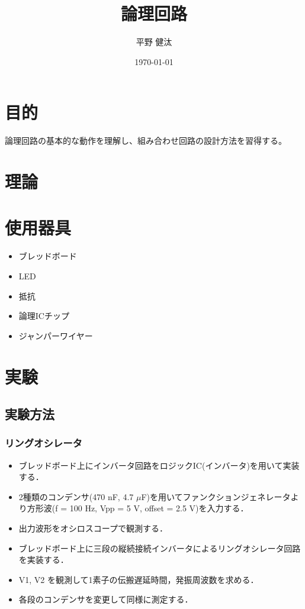 \documentclass{ltjsarticle}
\begin{document}
\title{論理回路}
\author{平野 健汰}
\date{\today}

\maketitle

\section{目的}
論理回路の基本的な動作を理解し、組み合わせ回路の設計方法を習得する。

\section{理論}

\section{使用器具}
\begin{itemize}
  \item ブレッドボード
  \item LED
  \item 抵抗
  \item 論理ICチップ
  \item ジャンパーワイヤー
\end{itemize}

\section{実験}
\subsection{実験方法}
\subsubsection{リングオシレータ}
\begin{itemize}
  \item ブレッドボード上にインバータ回路をロジックIC(インバータ)を用いて実装する．
  \item 2種類のコンデンサ(470 nF, 4.7 $\mu$F)を用いてファンクションジェネレータより方形波(f = 100 Hz, Vpp = 5 V, offset = 2.5 V)を入力する．
  \item 出力波形をオシロスコープで観測する．
\end{itemize}

\begin{itemize}
  \item ブレッドボード上に三段の縦続接続インバータによるリングオシレータ回路を実装する．
  \item V1, V2 を観測して1素子の伝搬遅延時間，発振周波数を求める．
  \item 各段のコンデンサを変更して同様に測定する．
\end{itemize}
\end{document}
